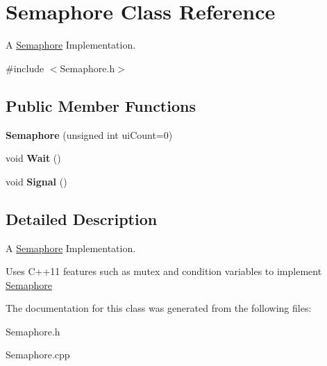 \hypertarget{classSemaphore}{}\section{Semaphore Class Reference}
\label{classSemaphore}


A \hyperlink{classSemaphore}{Semaphore} Implementation.  




{\ttfamily \#include $<$Semaphore.\+h$>$}

\subsection*{Public Member Functions}
\begin{DoxyCompactItemize}
\item 
\mbox{\label{classSemaphore_a0d9290d316636875ca85d1d78950a817}} 
{\bfseries Semaphore} (unsigned int ui\+Count=0)
\item 
\mbox{\label{classSemaphore_a72aabebf026e3a8b1f3e4d0fa8ee1eda}} 
void {\bfseries Wait} ()
\item 
\mbox{\label{classSemaphore_a86f92f738b4486439b296d8e235895f2}} 
void {\bfseries Signal} ()
\end{DoxyCompactItemize}


\subsection{Detailed Description}
A \hyperlink{classSemaphore}{Semaphore} Implementation. 

Uses C++11 features such as mutex and condition variables to implement \hyperlink{classSemaphore}{Semaphore} 

The documentation for this class was generated from the following files\+:\begin{DoxyCompactItemize}
\item 
Semaphore.\+h\item 
Semaphore.\+cpp\end{DoxyCompactItemize}
